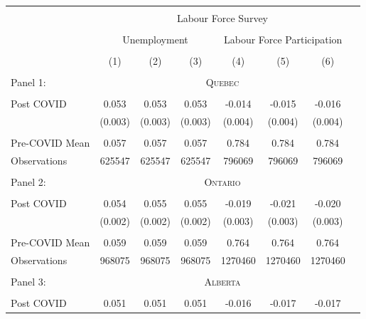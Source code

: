 \begin{tabular*}{\textwidth}{ @{\extracolsep{\fill}}l*{7}{c}}
\hline\hline
\\
 &\multicolumn{6}{c}{Labour Force Survey} \\
\cline{2-7} \\
&\multicolumn{3}{c}{Unemployment} &\multicolumn{3}{c}{Labour Force Participation} \\
\cline{2-4} \cline{5-7} \\
                                                  &\multicolumn{1}{c}{(1)}&\multicolumn{1}{c}{(2)}&\multicolumn{1}{c}{(3)}&\multicolumn{1}{c}{(4)}&\multicolumn{1}{c}{(5)}&\multicolumn{1}{c}{(6)}\\
\hline
\\
Panel 1: &\multicolumn{6}{c}{ \textsc{ Quebec } } \\
\hline
\\
Post COVID                                        &0.053&0.053&0.053&-0.014&-0.015&-0.016\\
                                                  &(0.003)&(0.003)&(0.003)&(0.004)&(0.004)&(0.004)\\
\\
Pre-COVID Mean                                    &0.057&0.057&0.057&0.784&0.784&0.784\\
Observations                                      &625547&625547&625547&796069&796069&796069\\
\hline \hline
\\
Panel 2: &\multicolumn{6}{c}{ \textsc{ Ontario } } \\
\hline
\\
Post COVID                                        &0.054&0.055&0.055&-0.019&-0.021&-0.020\\
                                                  &(0.002)&(0.002)&(0.002)&(0.003)&(0.003)&(0.003)\\
\\
Pre-COVID Mean                                    &0.059&0.059&0.059&0.764&0.764&0.764\\
Observations                                      &968075&968075&968075&1270460&1270460&1270460\\
\hline \hline
\\
Panel 3: &\multicolumn{6}{c}{ \textsc{ Alberta } } \\
\hline
\\
Post COVID                                        &0.051&0.051&0.051&-0.016&-0.017&-0.017\\

\end{tabular*}

